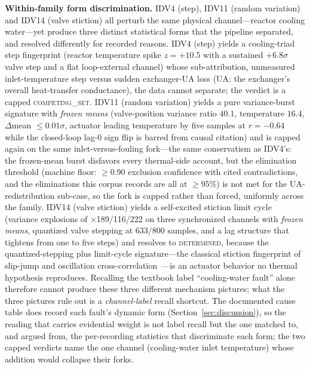 \documentclass[preprint,12pt]{elsarticle}
\begin{document}
\textbf{Within-family form discrimination.} IDV4 (step), IDV11 (random variation) and IDV14 (valve stiction) all perturb the same physical channel---reactor cooling water---yet produce three distinct statistical forms that the pipeline separated, and resolved differently for recorded reasons. IDV4 (step) yields a cooling-triad step fingerprint (reactor temperature spike $z{=}{+}10.5$ with a sustained $+6.8\sigma$ valve step and a flat loop-external channel) whose sub-attribution, unmeasured inlet-temperature step versus sudden exchanger-UA loss (UA: the exchanger's overall heat-transfer conductance), the data cannot separate; the verdict is a capped \mbox{\textsc{competing\_set}}. IDV11 (random variation) yields a pure variance-burst signature with \emph{frozen means} (valve-position variance ratio $40.1$, temperature $16.4$, $\Delta$mean $\le 0.01\sigma$, actuator leading temperature by five samples at $r{=}{-}0.64$ while the closed-loop lag-0 sign flip is barred from causal citation) and is capped again on the same inlet-versus-fouling fork---the same conservatism as IDV4's: the frozen-mean burst disfavors every thermal-side account, but the elimination threshold (machine floor: $\ge$0.90 exclusion confidence with cited contradictions, and the eliminations this corpus records are all at $\ge$95\%) is not met for the UA-redistribution sub-case, so the fork is capped rather than forced, uniformly across the family. IDV14 (valve stiction) yields a self-excited stiction limit cycle (variance explosions of $\times$189/116/222 on three synchronized channels with \emph{frozen means}, quantized valve stepping at $633/800$ samples, and a lag structure that tightens from one to five steps) and resolves to \mbox{\textsc{determined}}, because the quantized-stepping plus limit-cycle signature---the classical stiction fingerprint of slip-jump and oscillation cross-correlation~\cite{horch1999simple,hagglund1995control,choudhury2008diagnosis}---is an actuator behavior no thermal hypothesis reproduces. Recalling the textbook label ``cooling-water fault'' alone therefore cannot produce these three different mechanism pictures; what the three pictures rule out is a \emph{channel-label} recall shortcut. The documented cause table does record each fault's dynamic form (Section~\ref{sec:discussion}), so the reading that carries evidential weight is not label recall but the one matched to, and argued from, the per-recording statistics that discriminate each form; the two capped verdicts name the one channel (cooling-water inlet temperature) whose addition would collapse their forks.
\end{document}
